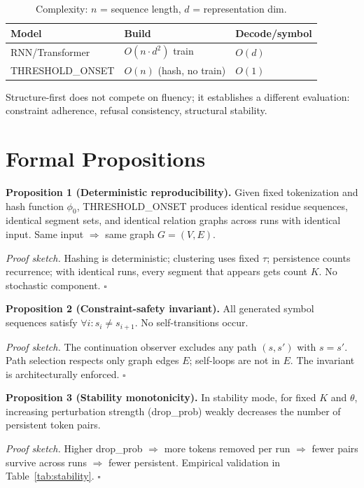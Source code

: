 \documentclass[10pt]{article}
\begin{document}
\begin{table}[t]
\centering
\caption{Complexity: $n$ = sequence length, $d$ = representation dim.}
\label{tab:complexity}
\begin{tabular}{lll}
\toprule
\textbf{Model} & \textbf{Build} & \textbf{Decode/symbol} \\
\midrule
RNN/Transformer & $O(n \cdot d^2)$ train & $O(d)$ \\
THRESHOLD\_ONSET & $O(n)$ (hash, no train) & $O(1)$ \\
\bottomrule
\end{tabular}
\end{table}

Structure-first does not compete on fluency; it establishes a different evaluation: constraint adherence, refusal consistency, structural stability.

\section{Formal Propositions}
\label{sec:formal}

\textbf{Proposition 1 (Deterministic reproducibility).}
Given fixed tokenization and hash function $\phi_0$, THRESHOLD\_ONSET produces identical residue sequences, identical segment sets, and identical relation graphs across runs with identical input. Same input $\Rightarrow$ same graph $G = (V, E)$.

\textit{Proof sketch.} Hashing is deterministic; clustering uses fixed $\tau$; persistence counts recurrence; with identical runs, every segment that appears gets count $K$. No stochastic component. $\square$

\textbf{Proposition 2 (Constraint-safety invariant).}
All generated symbol sequences satisfy $\forall i: s_i \neq s_{i+1}$. No self-transitions occur.

\textit{Proof sketch.} The continuation observer excludes any path $(s, s')$ with $s = s'$. Path selection respects only graph edges $E$; self-loops are not in $E$. The invariant is architecturally enforced. $\square$

\textbf{Proposition 3 (Stability monotonicity).}
In stability mode, for fixed $K$ and $\theta$, increasing perturbation strength (drop\_prob) weakly decreases the number of persistent token pairs.

\textit{Proof sketch.} Higher drop\_prob $\Rightarrow$ more tokens removed per run $\Rightarrow$ fewer pairs survive across runs $\Rightarrow$ fewer persistent. Empirical validation in Table~\ref{tab:stability}. $\square$
\end{document}
